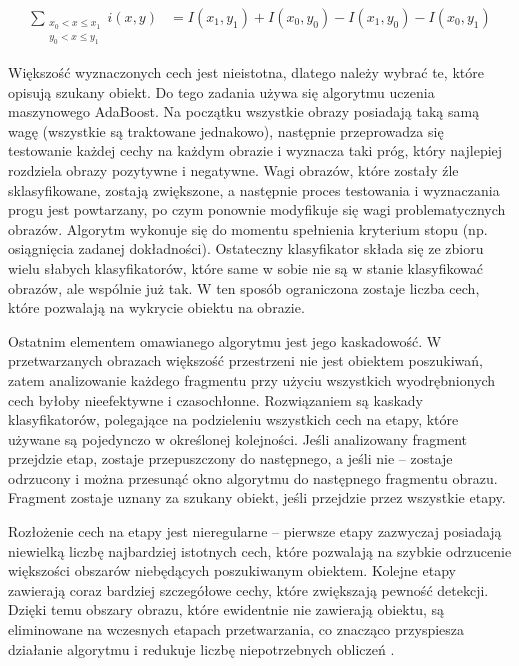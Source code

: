 \documentclass[a4paper,twoside,12pt]{book}
\begin{document}
\begin{align}
	\sum_{\substack{x_0 < x \leq x_1 \\ y_0 < x \leq y_1}} i(x,y) &= I(x_1,y_1) + I(x_0,y_0) - I(x_1,y_0) - I(x_0,y_1)
	\label{eq:obraz-calkowy}
\end{align}

Większość wyznaczonych cech jest nieistotna, dlatego należy wybrać te, które opisują szukany obiekt. Do tego zadania używa się algorytmu uczenia maszynowego AdaBoost. Na początku wszystkie obrazy posiadają taką samą wagę (wszystkie są traktowane jednakowo), następnie przeprowadza się testowanie każdej cechy na każdym obrazie i wyznacza taki próg, który najlepiej rozdziela obrazy pozytywne i negatywne. Wagi obrazów, które zostały źle sklasyfikowane, zostają zwiększone, a następnie proces testowania i wyznaczania progu jest powtarzany, po czym ponownie modyfikuje się wagi problematycznych obrazów. Algorytm wykonuje się do momentu spełnienia kryterium stopu (np. osiągnięcia zadanej dokładności). Ostateczny klasyfikator składa się ze zbioru wielu słabych klasyfikatorów, które same w sobie nie są w stanie klasyfikować obrazów, ale wspólnie już tak. W ten sposób ograniczona zostaje liczba cech, które pozwalają na wykrycie obiektu na obrazie.

Ostatnim elementem omawianego algorytmu jest jego kaskadowość. W przetwarzanych obrazach większość przestrzeni nie jest obiektem poszukiwań, zatem analizowanie każdego fragmentu przy użyciu wszystkich wyodrębnionych cech byłoby nieefektywne i czasochłonne. Rozwiązaniem są kaskady klasyfikatorów, polegające na podzieleniu wszystkich cech na etapy, które używane są pojedynczo w określonej kolejności. Jeśli analizowany fragment przejdzie etap, zostaje przepuszczony do następnego, a jeśli nie -- zostaje odrzucony i można przesunąć okno algorytmu do następnego fragmentu obrazu. Fragment zostaje uznany za szukany obiekt, jeśli przejdzie przez wszystkie etapy.

Rozłożenie cech na etapy jest nieregularne -- pierwsze etapy zazwyczaj posiadają niewielką liczbę najbardziej istotnych cech, które pozwalają na szybkie odrzucenie większości obszarów niebędących poszukiwanym obiektem. Kolejne etapy zawierają coraz bardziej szczegółowe cechy, które zwiększają pewność detekcji. Dzięki temu obszary obrazu, które ewidentnie nie zawierają obiektu, są eliminowane na wczesnych etapach przetwarzania, co znacząco przyspiesza działanie algorytmu i redukuje liczbę niepotrzebnych obliczeń \cite{bib:Haar-OpenCV}.
\end{document}
